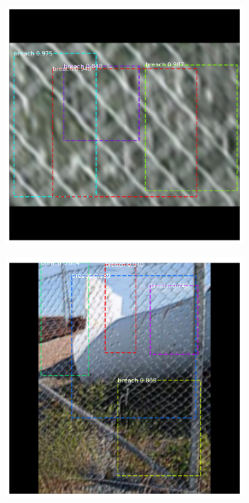 \documentclass[../Head/Main.tex]{subfiles}
\begin{document}
\begin{figure}[H]
\begin{subfigure}{.23\textwidth}
        \caption{}
        \label{fig:rcnn_bad_performance2}
    \end{subfigure}
    \hfill
    \begin{subfigure}{.23\textwidth}
        \centering
        \includegraphics[width=\textwidth]{../Figures/rcnn_results/found_breaches/bad_performance/12.png}
        \caption{}
    \end{subfigure}
    \hfill
    \begin{subfigure}{.23\textwidth}
        \centering
        \includegraphics[width=\textwidth]{../Figures/rcnn_results/found_breaches/bad_performance/6.png}

\end{subfigure}
\end{figure}
\end{document}
